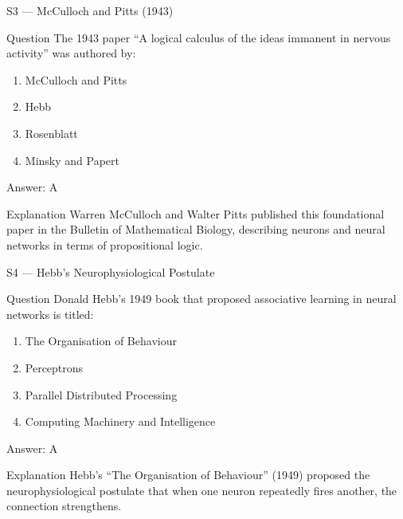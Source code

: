 \documentclass[aspectratio=169,8pt]{beamer}
\begin{document}
	\begin{frame}{S3 --- McCulloch and Pitts (1943)}
		\begin{block}{Question}
			The 1943 paper ``A logical calculus of the ideas immanent in nervous activity'' was authored by:
			\begin{enumerate}
				\item McCulloch and Pitts
				\item Hebb
				\item Rosenblatt
				\item Minsky and Papert
			\end{enumerate}
		\end{block}
		\begin{exampleblock}{Answer: A}\end{exampleblock}
		\begin{block}{Explanation}
			Warren McCulloch and Walter Pitts published this foundational paper in the Bulletin of Mathematical Biology, describing neurons and neural networks in terms of propositional logic.
		\end{block}
	\end{frame}
	
	\begin{frame}{S4 --- Hebb's Neurophysiological Postulate}
		\begin{block}{Question}
			Donald Hebb's 1949 book that proposed associative learning in neural networks is titled:
			\begin{enumerate}
				\item The Organisation of Behaviour
				\item Perceptrons
				\item Parallel Distributed Processing
				\item Computing Machinery and Intelligence
			\end{enumerate}
		\end{block}
		\begin{exampleblock}{Answer: A}\end{exampleblock}
		\begin{block}{Explanation}
			Hebb's ``The Organisation of Behaviour'' (1949) proposed the neurophysiological postulate that when one neuron repeatedly fires another, the connection strengthens.
		\end{block}
	\end{frame}
	
\end{document}
